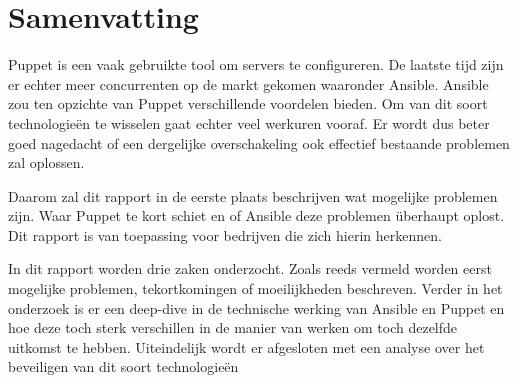 





\chapter*{Samenvatting}
Puppet is een vaak gebruikte tool om servers te configureren. De laatste tijd zijn er echter meer concurrenten op de markt gekomen waaronder Ansible. Ansible zou ten opzichte van Puppet verschillende voordelen bieden. Om van dit soort technologieën te wisselen gaat echter veel werkuren vooraf. Er wordt dus beter goed nagedacht of een dergelijke overschakeling ook effectief bestaande problemen zal oplossen.

Daarom zal dit rapport in de eerste plaats beschrijven wat mogelijke problemen zijn. Waar Puppet te kort schiet en of Ansible deze problemen \"uberhaupt oplost. Dit rapport is van toepassing voor bedrijven die zich hierin herkennen.

In dit rapport worden drie zaken onderzocht. Zoals reeds vermeld worden eerst mogelijke problemen, tekortkomingen of moeilijkheden beschreven. Verder in het onderzoek is er een deep-dive in de technische werking van Ansible en Puppet en hoe deze toch sterk verschillen in de manier van werken om toch dezelfde uitkomst te hebben. Uiteindelijk wordt er afgesloten {\color{red}met een analyse over het beveiligen van dit soort technologie\"en}

